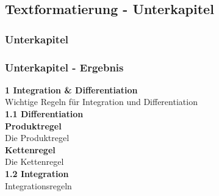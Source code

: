 \documentclass{beamer}
\begin{document}
\subsection{Textformatierung - Unterkapitel}
\begin{frame}[fragile]
\frametitle{Unterkapitel}
\begin{semiverbatim}
\end{semiverbatim}
\end{frame}

\begin{frame}
\frametitle{Unterkapitel - Ergebnis}
  \Large \textbf{1 Integration \& Differentiation} \\
  \vspace{1ex}
  \normalsize Wichtige Regeln für Integration und Differentiation\\
  \vspace{2ex}
  \large \textbf{1.1 Differentiation} \\
  \vspace{1ex}
  \normalsize \textbf{Produktregel} \\
  Die Produktregel\\
  \vspace{2ex}
  \textbf{Kettenregel} \\
  Die Kettenregel \\
  \vspace{2ex}
  \large \textbf{1.2 Integration}\\
  \vspace{1ex}
  \normalsize Integrationsregeln
\end{frame}
\end{document}
